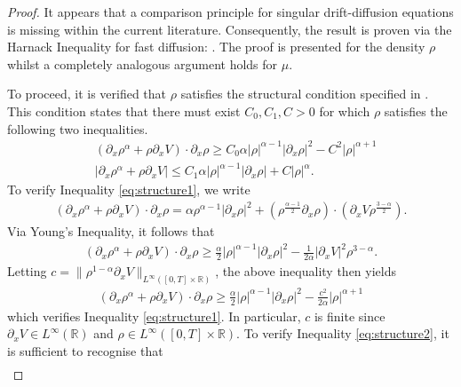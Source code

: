 \documentclass[a4paper,twosided, 11pt]{article}
\newcommand{\R}{\mathbb{R}}
\theoremstyle{plain}
\theoremstyle{remark}
\numberwithin{equation}{section}
\begin{document}
\begin{proof} 
It appears that a comparison principle for singular drift-diffusion equations is missing within the current literature. 
Consequently, the result is proven via the Harnack Inequality for fast diffusion: \cite[Corollary 16.1]{DiBenedettoGianazzaVespri12}. 
The proof is presented for the density $\rho$ whilst a completely analogous argument holds for $\mu$.

\medskip 

To proceed, it is verified that $\rho$ satisfies the structural condition specified in \cite[Inequality 5.2, Page 33]{DiBenedettoGianazzaVespri12}. 
This condition states that there must exist $C_0,C_1, C > 0$ for which $\rho$ satisfies the following two inequalities. 
\begin{align}
    & (\partial_x \rho^\alpha + \rho \partial_x V) \cdot \partial_x \rho \geq C_0 \alpha |\rho|^{\alpha-1} |\partial_x \rho|^2 - C^2 |\rho|^{\alpha+1} \label{eq:structure1}\\
    & |\partial_x \rho^\alpha + \rho \partial_x V| \leq C_1 \alpha |\rho|^{\alpha-1}|\partial_x\rho|+ C|\rho|^\alpha. \label{eq:structure2}
\end{align}
To verify Inequality \eqref{eq:structure1}, we write 
\begin{align*}
    (\partial_x \rho^\alpha + \rho \partial_x V) \cdot \partial_x \rho = \alpha \rho^{\alpha-1} |\partial_x \rho|^2 + (\rho^{\frac{\alpha-1}{2}}\partial_x\rho) \cdot (\partial_x V \rho^\frac{3-\alpha}{2}).
\end{align*}
Via Young's Inequality, it follows that 
\begin{align*}
    (\partial_x \rho^\alpha + \rho \partial_x V) \cdot \partial_x \rho \geq \frac{\alpha}{2} |\rho|^{\alpha-1} |\partial_x \rho|^2 - \frac{1}{2\alpha} |\partial_x V|^2 \rho^{3-\alpha}.
\end{align*}
Letting $c = \|\rho^{1-\alpha}\partial_x V \|_{L^\infty([0,T]\times \R)}$, the above inequality then yields 
\begin{align*}
    (\partial_x \rho^\alpha + \rho \partial_x V) \cdot \partial_x \rho \geq \frac{\alpha}{2} |\rho|^{\alpha-1} |\partial_x \rho|^2 - \frac{c^2}{2\alpha} |\rho|^{\alpha+1}
\end{align*}
which verifies Inequality \eqref{eq:structure1}.
In particular, $c$ is finite since $\partial_x V \in L^\infty(\R)$ and $\rho \in L^\infty([0,T]\times \R)$.
To verify Inequality \eqref{eq:structure2}, it is sufficient to recognise that 
\begin{align*}

\end{align*}
\end{proof}
\end{document}
